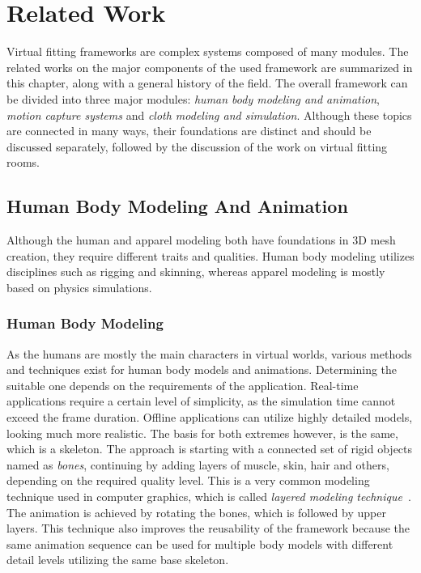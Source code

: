\chapter{Related Work}
\label{chapter_related_work}

Virtual fitting frameworks are complex systems composed of many modules. The related works on the major components of the used framework are summarized in this chapter, along with a general history of the field. 
The overall framework can be divided into three major modules: \textit{human body modeling and animation}, \textit{motion capture systems} and \textit{cloth modeling and simulation}. Although these topics are connected in many ways, their foundations are distinct and should be discussed separately, followed by the discussion of the work on virtual fitting rooms.

\section{Human Body Modeling And Animation}
\label{section_related_modeling}

Although the human and apparel modeling both have foundations in 3D mesh creation, they require different traits and qualities. Human body modeling utilizes disciplines such as rigging and skinning, whereas apparel modeling is mostly based on physics simulations.

\subsection{Human Body Modeling}
As the humans are mostly the main characters in virtual worlds, various methods and techniques exist for human body models and animations. Determining the suitable one depends on the requirements of the application. Real-time applications require a certain level of simplicity, as the simulation time cannot exceed the frame duration. Offline applications can utilize highly detailed models, looking much more realistic. The basis for both extremes however, is the same, which is a skeleton. The approach is starting with a connected set of rigid objects named as \textit{bones}, continuing by adding layers of muscle, skin, hair and others, depending on the required quality level. This is a very common modeling technique used in computer graphics, which is called \textit{layered modeling technique}~\cite{Chadwick1989}. The animation is achieved by rotating the bones, which is followed by upper layers. This technique also improves the reusability of the framework because the same animation sequence can be used for multiple body models with different detail levels utilizing the same base skeleton.   


